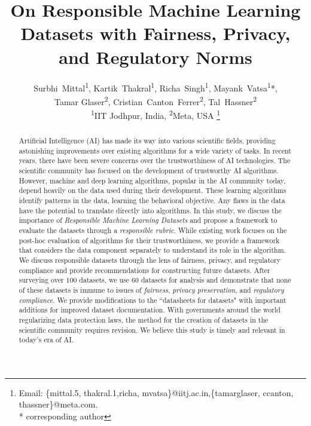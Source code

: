 \documentclass[journal]{IEEEtran}
\begin{document}
\title{On Responsible Machine Learning Datasets with Fairness, Privacy, and Regulatory Norms}

\author{Surbhi~Mittal\textsuperscript{1}, Kartik~Thakral\textsuperscript{1}, Richa~Singh\textsuperscript{1}, Mayank~Vatsa\textsuperscript{1}*, \\ Tamar Glaser\textsuperscript{2}, Cristian~Canton~Ferrer\textsuperscript{2}, Tal~Hassner\textsuperscript{2} \protect\\
\textsuperscript{1}IIT Jodhpur, India, \textsuperscript{2}Meta, USA
\thanks{
Email: \{mittal.5, thakral.1,richa, mvatsa\}@iitj.ac.in,\{tamarglaser, ccanton, thassner\}@meta.com.\protect \\ * corresponding author
}}
\onecolumn
\maketitle
\begin{abstract}
Artificial Intelligence (AI) has made its way into various scientific fields, providing astonishing improvements over existing algorithms for a wide variety of tasks. In recent years, there have been severe concerns over the trustworthiness of AI technologies. The scientific community has focused on the development of trustworthy AI algorithms. However, machine and deep learning algorithms, popular in the AI community today, depend heavily on the data used during their development. These learning algorithms identify patterns in the data, learning the behavioral objective. Any flaws in the data have the potential to translate directly into algorithms. In this study, we discuss the importance of \textit{Responsible Machine Learning Datasets} and propose a framework to evaluate the datasets through a \textit{responsible rubric}. While existing work focuses on the post-hoc evaluation of algorithms for their trustworthiness, we provide a framework that considers the data component separately to understand its role in the algorithm. We discuss responsible datasets through the lens of fairness, privacy, and regulatory compliance and provide recommendations for constructing future datasets. After surveying over 100 datasets, we use 60 datasets for analysis and demonstrate that none of these datasets is immune to issues of \textit{fairness}, \textit{privacy preservation}, and \textit{regulatory compliance}. We provide modifications to the ``datasheets for datasets" with important additions for improved dataset documentation. With governments around the world regularizing data protection laws, the method for the creation of datasets in the scientific community requires revision. We believe this study is timely and relevant in today's era of AI.
\end{abstract}
\end{document}
